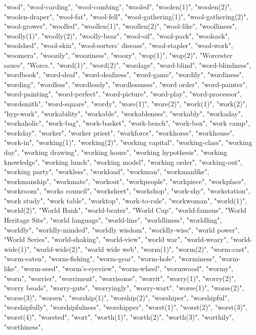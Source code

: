"wool",
"wool-carding",
"wool-combing",
"wooled",
"woolen(1)",
"woolen(2)",
"woolen-draper",
"wool-fat",
"wool-fell",
"wool-gathering(1)",
"wool-gathering(2)",
"wool-grower",
"woolled",
"woollen(1)",
"woollen(2)",
"wool-like",
"woolliness",
"woolly(1)",
"woolly(2)",
"woolly-bear",
"wool-oil",
"wool-pack",
"woolsack",
"woolshed",
"wool-skin",
"wool-sorters' disease",
"wool-stapler",
"wool-work",
"woomera",
"woozily",
"wooziness",
"woozy",
"wop(1)",
"wop(2)",
"Worcester sauce",
"Worcs.",
"word(1)",
"word(2)",
"wordage",
"word-blind",
"word-blindness",
"wordbook",
"word-deaf",
"word-deafness",
"word-game",
"wordily",
"wordiness",
"wording",
"wordless",
"wordlessly",
"wordlessness",
"word order",
"word-painter",
"word-painting",
"word-perfect",
"word-picture",
"word-play",
"word-processor",
"wordsmith",
"word-square",
"wordy",
"wore(1)",
"wore(2)",
"work(1)",
"work(2)",
"hyp-work",
"workability",
"workable",
"workableness",
"workably",
"workaday",
"workaholic",
"work-bag",
"work-basket",
"work-bench",
"work-box",
"work camp",
"workday",
"worker",
"worker priest",
"workforce",
"workhorse",
"workhouse",
"work-in",
"working(1)",
"working(2)",
"working capital",
"working-class",
"working day",
"working drawing",
"working hours",
"working hypothesis",
"working knowledge",
"working lunch",
"working model",
"working order",
"working-out",
"working party",
"workless",
"workload",
"workman",
"workmanlike",
"workmanship",
"workmate",
"workout",
"workpeople",
"workpiece",
"workplace",
"workroom",
"works council",
"worksheet",
"workshop",
"work-shy",
"workstation",
"work study",
"work table",
"worktop",
"work-to-rule",
"workwoman",
"world(1)",
"world(2)",
"World Bank",
"world-beater",
"World Cup",
"world-famous",
"World Heritage Site",
"world language",
"world-line",
"worldliness",
"worldling",
"worldly",
"worldly-minded",
"worldly wisdom",
"worldly-wise",
"world power",
"World Series",
"world-shaking",
"world-view",
"world war",
"world-weary",
"world-wide(1)",
"world-wide(2)",
"world wide web",
"worm(1)",
"worm(2)",
"worm-cast",
"worm-eaten",
"worm-fishing",
"worm-gear",
"worm-hole",
"worminess",
"worm-like",
"worm-seed",
"worm's-eyeview",
"worm-wheel",
"wormwood",
"wormy",
"worn",
"worrier",
"worriment",
"worrisome",
"worrit",
"worry(1)",
"worry(2)",
"worry beads",
"worry-guts",
"worryingly",
"worry-wart",
"worse(1)",
"worse(2)",
"worse(3)",
"worsen",
"worship(1)",
"worship(2)",
"worshiper",
"worshipful",
"worshipfully",
"worshipfulness",
"worshipper",
"worst(1)",
"worst(2)",
"worst(3)",
"worst(4)",
"worsted",
"wort",
"worth(1)",
"worth(2)",
"worth(3)",
"worthily",
"worthiness",
